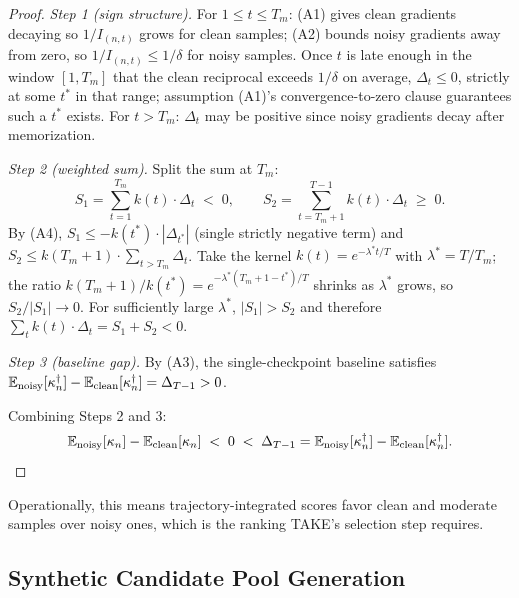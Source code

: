 \documentclass[12pt, a4paper, twoside]{book}
\numberwithin{equation}{chapter}
\theoremstyle{plain}
\theoremstyle{definition}
\theoremstyle{remark}
\newenvironment{foldable}{}{}
\begin{document}
\begin{foldable}
\begin{proof}
    \textit{Step 1 (sign structure).}
    For $1 \leq t \leq T_m$: (A1) gives clean gradients decaying so $1/I_{(n,t)}$ grows for clean samples; (A2) bounds noisy gradients away from zero, so $1/I_{(n,t)} \leq 1/\delta$ for noisy samples.
    Once $t$ is late enough in the window $[1, T_m]$ that the clean reciprocal exceeds $1/\delta$ on average, $\Delta_t \leq 0$, strictly at some $t^*$ in that range; assumption (A1)'s convergence-to-zero clause guarantees such a $t^*$ exists.
    For $t > T_m$: $\Delta_t$ may be positive since noisy gradients decay after memorization.

    \textit{Step 2 (weighted sum).}
    Split the sum at $T_m$:
    \begin{equation*}
      S_1 = \sum_{t=1}^{T_m} k(t) \cdot \Delta_t \;<\; 0,
      \qquad
      S_2 = \sum_{t=T_m+1}^{T-1} k(t) \cdot \Delta_t \;\geq\; 0.
    \end{equation*}
    By (A4), $S_1 \leq -k(t^*) \cdot |\Delta_{t^*}|$ (single strictly negative term) and $S_2 \leq k(T_m+1) \cdot \sum_{t > T_m} \Delta_t$.
    Take the kernel $k(t) = e^{-\lambda^* t / T}$ with $\lambda^* = T/T_m$; the ratio $k(T_m+1)/k(t^*) = e^{-\lambda^*(T_m+1-t^*)/T}$ shrinks as $\lambda^*$ grows, so $S_2 / |S_1| \to 0$.
    For sufficiently large $\lambda^*$, $|S_1| > S_2$ and therefore $\sum_t k(t) \cdot \Delta_t = S_1 + S_2 < 0$.

    \textit{Step 3 (baseline gap).}
    By (A3), the single-checkpoint baseline satisfies $\mathbb{E}_\textup{noisy}[\kappa^\dagger_n] - \mathbb{E}_\textup{clean}[\kappa^\dagger_n] = \Delta_{T-1} > 0$.

    Combining Steps 2 and 3:
    \begin{equation*}
      \mathbb{E}_\textup{noisy}[\kappa_n] - \mathbb{E}_\textup{clean}[\kappa_n] \;<\; 0 \;<\; \Delta_{T-1} = \mathbb{E}_\textup{noisy}[\kappa^\dagger_n] - \mathbb{E}_\textup{clean}[\kappa^\dagger_n].
    \end{equation*}
  \end{proof}
  Operationally, this means trajectory-integrated scores favor clean and moderate samples over noisy ones, which is the ranking TAKE's selection step requires.
\end{foldable}

\subsection{Synthetic Candidate Pool Generation} \label{sec:53-research03-method-synthetic}
\end{document}
